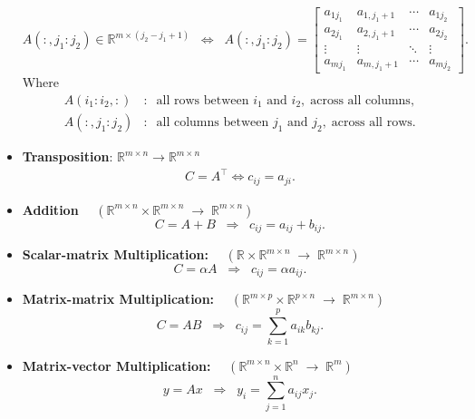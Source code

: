 \documentclass{report}
\begin{document}
\begin{itemize}
            \[
                A(:,j_{1}:j_{2}) \in \mathbb{R}^{m \times (j_{2}-j_{1}+1)}
                \;\;\Longleftrightarrow\;\;
                A(:,j_{1}:j_{2}) =
                \begin{bmatrix}
                    a_{1j_{1}} & a_{1,j_{1}+1} & \cdots & a_{1j_{2}} \\
                    a_{2j_{1}} & a_{2,j_{1}+1} & \cdots & a_{2j_{2}} \\
                    \vdots & \vdots & \ddots & \vdots \\
                    a_{mj_{1}} & a_{m,j_{1}+1} & \cdots & a_{mj_{2}}
                \end{bmatrix}.
            \]
            Where
            \[
                \begin{aligned}
                    A(i_{1}:i_{2},:) &:\;\; \text{all rows between } i_{1} \text{ and } i_{2}, \;\text{across all columns}, \\[6pt]
                    A(:,j_{1}:j_{2}) &:\;\; \text{all columns between } j_{1} \text{ and } j_{2}, \;\text{across all rows}.
                \end{aligned}
            \]
        \item \textbf{Transposition}: $\mathbb{R}^{m\times n} \to \mathbb{R}^{m\times n} $
            \begin{align*}
                C = A^{\top} \iff c_{ij} = a_{ji}
            .\end{align*}
        \item \textbf{Addition} $\quad (\mathbb{R}^{m \times n} \times \mathbb{R}^{m \times n} \;\to\; \mathbb{R}^{m \times n})$
            \[
                C = A + B 
                \;\;\Longrightarrow\;\; 
                c_{ij} = a_{ij} + b_{ij}.
            \]

        \item \textbf{Scalar-matrix Multiplication: } $\quad (\mathbb{R} \times \mathbb{R}^{m \times n} \;\to\; \mathbb{R}^{m \times n})$
            \[
                C = \alpha A 
                \;\;\Longrightarrow\;\; 
                c_{ij} = \alpha a_{ij}.
            \]

        \item \textbf{Matrix-matrix Multiplication: } $\quad (\mathbb{R}^{m \times p} \times \mathbb{R}^{p \times n} \;\to\; \mathbb{R}^{m \times n})$
            \[
                C = AB 
                \;\;\Longrightarrow\;\; 
                c_{ij} = \sum_{k=1}^{p} a_{ik} b_{kj}.
            \]
        \item \textbf{Matrix-vector Multiplication: } $\quad (\mathbb{R}^{m \times n} \times \mathbb{R}^n \;\to\; \mathbb{R}^m)$
            \[
                y = Ax 
                \;\;\Longrightarrow\;\; 
                y_i = \sum_{j=1}^{n} a_{ij} x_j.
            \]


\end{itemize}
\end{document}
